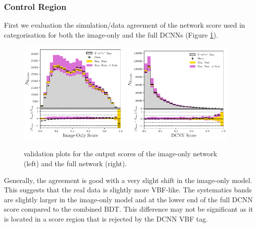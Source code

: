 \subsubsection{\Zee Control Region}
First we evaluation the simulation/data agreement of the network score used in categorisation for both the image-only and the full DCNNs (Figure \ref{fig:event_categorisation:int_score_zee}). 
\begin{figure}[h!]
    \begin{center}
        \includegraphics[width=0.48\textwidth]{figures/event_selection/img_score_zee_LPS.pdf}
        \includegraphics[width=0.48\textwidth]{figures/event_selection/int_score_zee_LPS.pdf}
    \end{center}
    \caption{\Zee validation plots for the output scores of the image-only network (left) and the full network (right).}
    \label{fig:event_categorisation:int_score_zee}
\end{figure}

Generally, the agreement is good with a very slight shift in the image-only model. This suggests that the real data is slightly more VBF-like. 
The systematics bands are slightly larger in the image-only model and at the lower end of the full DCNN score compared to the combined BDT. This difference may not be significant as it is located in a score region that is rejected by the DCNN VBF tag.  


